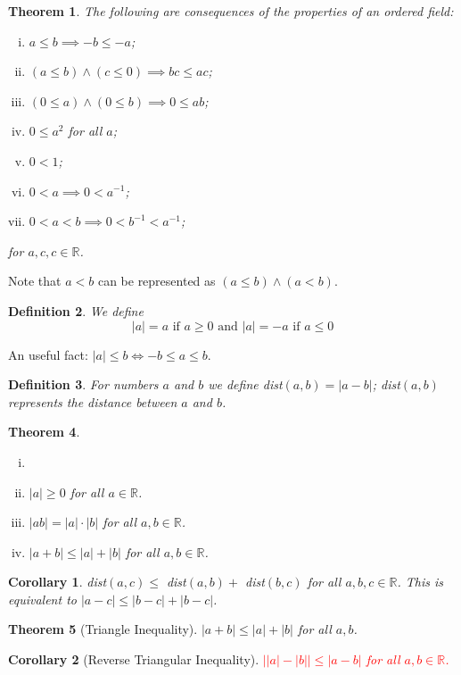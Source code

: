 \documentclass[12pt, lettersize]{book}
\newtheorem{thm}{Theorem}[section]
\newtheorem{dfn}[thm]{Definition}
\newtheorem{cor}{Corollary}[thm]
\newcommand{\R}{\mathbb{R}}
\begin{document}
	\begin{thm}\label{thm:3.2}
		The following are consequences of the properties of an ordered field:
		\begin{enumerate}[(i)]
			\item $a\leq b\implies-b\leq-a$;
			\item $(a\leq b)\land(c\leq0)\implies bc\leq ac$;
			\item $(0\leq a)\land(0\leq b)\implies 0\leq ab$;
			\item $0\leq a^2$ for all $a$;
			\item $0<1$;
			\item $0<a\implies0< a^{-1}$;
			\item $0<a<b\implies0<b^{-1}<a^{-1}$;
		\end{enumerate}
		for $a,c,c\in\R$.
	\end{thm}
	Note that $a<b$ can be represented as $(a\leq b)\land(a<b)$.
	
	\begin{dfn}\label{def:3.3}
		We define
		\begin{displaymath}
			\text{$|a|=a$ if $a\geq0$  and   $|a|=-a$ if $a\leq0$}
		\end{displaymath}
	\end{dfn}
	
	An useful fact: $|a|\leq b\iff -b\leq a\leq b$.
	
	\begin{dfn}\label{def:3.4}
		For numbers $a$ and $b$ we define dist$(a,b)=|a-b|$; dist$(a,b)$ represents the \emph{distance between $a$ and $b$}.
	\end{dfn}
	
	\begin{thm}\label{thm:3.5}
		\begin{enumerate}[(i)]
			\item[]
			\item $|a|\geq0$ for all $a\in\R$.
			\item $|ab|=|a|\cdot|b|$ for all $a,b\in\R$.
			\item $|a+b|\leq|a|+|b|$ for all $a,b\in\R$. 
		\end{enumerate}
	\end{thm}
	
	\begin{cor}\label{cor:3.6}
		dist$(a,c)\leq$ dist$(a,b)+$ dist$(b,c)$ for all $a,b,c\in\R$. This is equivalent to $|a-c|\leq|b-c|+|b-c|$.
	\end{cor}
	
	\begin{thm}[Triangle Inequality]\label{thm:3.7}
		$|a+b|\leq|a|+|b|$ for all $a,b$.
	\end{thm}
	\begin{cor}[Reverse Triangular Inequality]\label{cor: reverse triangular}
		\textcolor{red}{$\big||a|-|b|\big|\leq|a-b|$ for all $a,b\in\R$.}	
	\end{cor}
	
\end{document}
